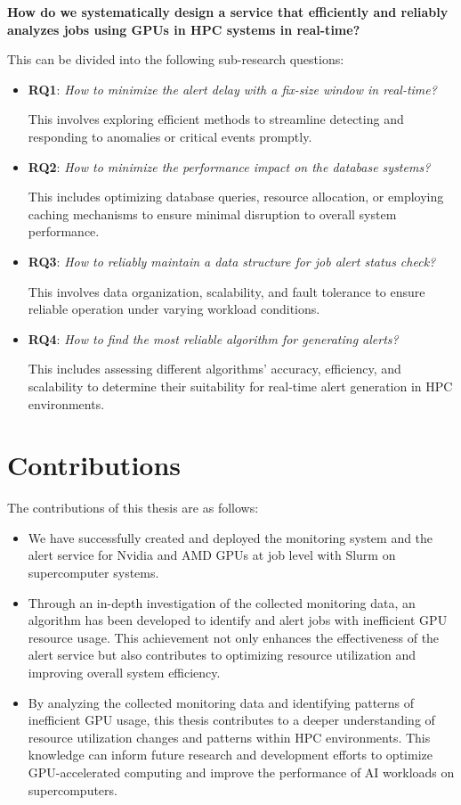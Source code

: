 \textbf{
How do we systematically design a service that efficiently and reliably analyzes jobs using GPUs in HPC systems in real-time?
}

This can be divided into the following sub-research questions:

\begin{itemize}
    \item \textbf{RQ1}: \textit{How to minimize the alert delay with a fix-size window in real-time?}

This involves exploring efficient methods to streamline detecting and responding to anomalies or critical events promptly.

    \item \textbf{RQ2}: \textit{How to minimize the performance impact on the database systems?}

This includes optimizing database queries, resource allocation, or employing caching mechanisms to ensure minimal disruption to overall system performance.

    \item \textbf{RQ3}: \textit{How to reliably maintain a data structure for job alert status check?}

This involves data organization, scalability, and fault tolerance to ensure reliable operation under varying workload conditions.
    
    \item \textbf{RQ4}: \textit{How to find the most reliable algorithm for generating alerts?}

This includes assessing different algorithms' accuracy, efficiency, and scalability to determine their suitability for real-time alert generation in HPC environments.

\end{itemize}


\section{Contributions}

The contributions of this thesis are as follows:

\begin{itemize}
    \item We have successfully created and deployed the monitoring system and the alert service for Nvidia and AMD GPUs at job level with Slurm on supercomputer systems.
    \item Through an in-depth investigation of the collected monitoring data, an algorithm has been developed to identify and alert jobs with inefficient GPU resource usage. This achievement not only enhances the effectiveness of the alert service but also contributes to optimizing resource utilization and improving overall system efficiency.
    \item By analyzing the collected monitoring data and identifying patterns of inefficient GPU usage, this thesis contributes to a deeper understanding of resource utilization changes and patterns within HPC environments. This knowledge can inform future research and development efforts to optimize GPU-accelerated computing and improve the performance of AI workloads on supercomputers.
\end{itemize}

